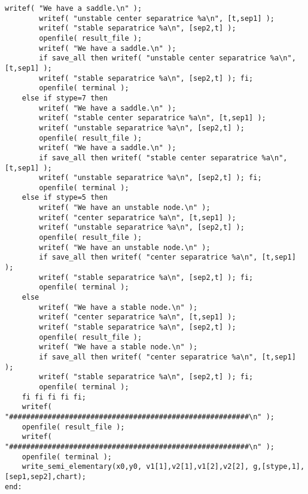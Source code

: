 \documentclass[a4paper,10pt]{article}
\begin{document}
\begin{lstlisting}[name=type]
        writef( "We have a saddle.\n" );
        writef( "unstable center separatrice %a\n", [t,sep1] );
        writef( "stable separatrice %a\n", [sep2,t] );
        openfile( result_file );
        writef( "We have a saddle.\n" );
        if save_all then writef( "unstable center separatrice %a\n", [t,sep1] );
        writef( "stable separatrice %a\n", [sep2,t] ); fi;
        openfile( terminal );
    else if stype=7 then
        writef( "We have a saddle.\n" );
        writef( "stable center separatrice %a\n", [t,sep1] );
        writef( "unstable separatrice %a\n", [sep2,t] );
        openfile( result_file );
        writef( "We have a saddle.\n" );
        if save_all then writef( "stable center separatrice %a\n", [t,sep1] );
        writef( "unstable separatrice %a\n", [sep2,t] ); fi;
        openfile( terminal );
    else if stype=5 then
        writef( "We have an unstable node.\n" );
        writef( "center separatrice %a\n", [t,sep1] );
        writef( "unstable separatrice %a\n", [sep2,t] );
        openfile( result_file );
        writef( "We have an unstable node.\n" );
        if save_all then writef( "center separatrice %a\n", [t,sep1] );
        writef( "stable separatrice %a\n", [sep2,t] ); fi;
        openfile( terminal );
    else
        writef( "We have a stable node.\n" );
        writef( "center separatrice %a\n", [t,sep1] );
        writef( "stable separatrice %a\n", [sep2,t] );
        openfile( result_file );
        writef( "We have a stable node.\n" );
        if save_all then writef( "center separatrice %a\n", [t,sep1] );
        writef( "stable separatrice %a\n", [sep2,t] ); fi;
        openfile( terminal );
    fi fi fi fi fi;
    writef( "########################################################\n" );
    openfile( result_file );
    writef( "########################################################\n" );
    openfile( terminal );
    write_semi_elementary(x0,y0, v1[1],v2[1],v1[2],v2[2], g,[stype,1],[sep1,sep2],chart);
end:
\end{lstlisting}
\end{document}
